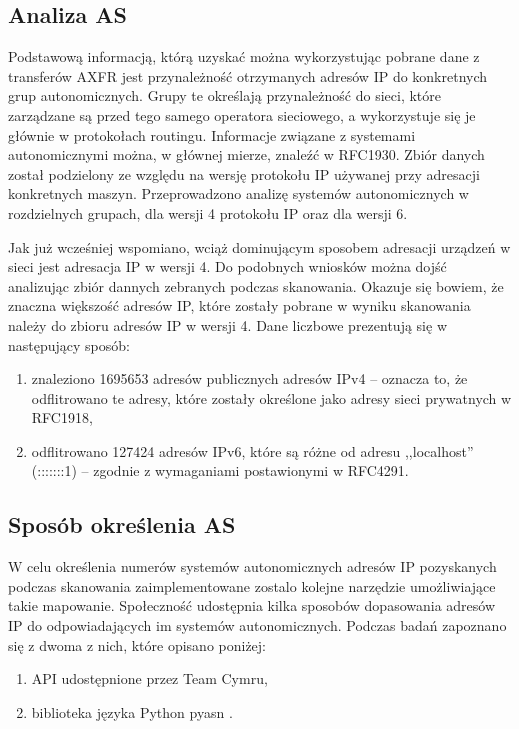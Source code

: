 \subsection{Analiza AS}
Podstawową informacją, którą uzyskać można wykorzystując pobrane dane z transferów AXFR jest przynależność otrzymanych adresów IP do konkretnych grup autonomicznych. Grupy te określają przynależność do sieci, które zarządzane są przed tego samego operatora sieciowego, a wykorzystuje się je głównie w protokołach routingu. Informacje związane z systemami autonomicznymi można, w głównej mierze, znaleźć w RFC1930\cite{RFC1930}. Zbiór danych został podzielony ze względu na wersję protokołu IP używanej przy adresacji konkretnych maszyn. Przeprowadzono analizę systemów autonomicznych w rozdzielnych grupach, dla wersji 4 protokołu IP oraz dla wersji 6. 

Jak już wcześniej wspomiano, wciąż dominującym sposobem adresacji urządzeń w sieci jest adresacja IP w wersji 4\cite{Ipv6_deployment}. Do podobnych wniosków można dojść analizując zbiór dannych zebranych podczas skanowania. Okazuje się bowiem, że znaczna większość adresów IP, które zostały pobrane w wyniku skanowania należy do zbioru adresów IP w wersji 4. Dane liczbowe prezentują się w następujący sposób:
\begin{enumerate}
	\item znaleziono 1695653 adresów publicznych adresów IPv4 -- oznacza to, że odflitrowano te adresy, które zostały określone jako adresy sieci prywatnych w RFC1918\cite{RFC1918},
	\item odflitrowano 127424 adresów IPv6, które są różne od adresu ,,localhost'' (:::::::1) -- zgodnie z wymaganiami postawionymi w RFC4291\cite{RFC4291}.
\end{enumerate}

\subsection{Sposób określenia AS}
W celu określenia numerów systemów autonomicznych adresów IP pozyskanych podczas skanowania zaimplementowane zostalo kolejne narzędzie umożliwiające takie mapowanie. Społeczność udostępnia kilka sposobów dopasowania adresów IP do odpowiadających im systemów autonomicznych. Podczas badań zapoznano się z dwoma z nich, które opisano poniżej:
\begin{enumerate}
	\item API udostępnione przez Team Cymru\cite{cymru},
	\item biblioteka języka Python pyasn \cite{pyasn}.
\end{enumerate}

